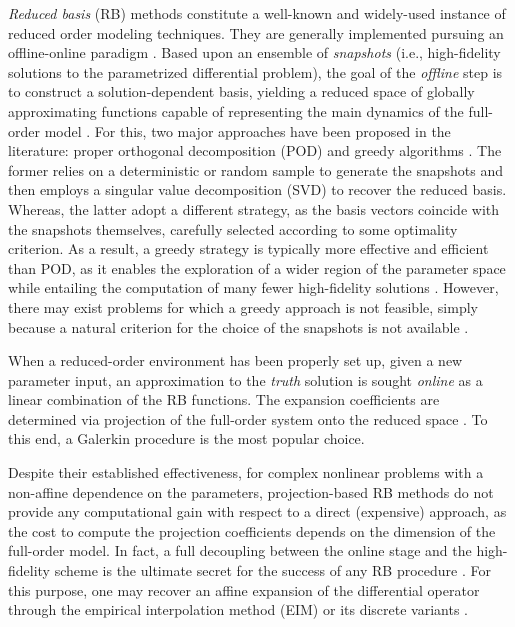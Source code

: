\documentclass{elsarticle}
\theoremstyle{theorem}
\theoremstyle{definition}
\theoremstyle{remark}
\theoremstyle{proposition}
\numberwithin{figure}{section}
\begin{document}
		\emph{Reduced basis} (RB) methods constitute a well-known and widely-used instance of reduced order modeling techniques. They are generally implemented pursuing an offline-online paradigm \cite{Mad06}. Based upon an ensemble of \emph{snapshots} (i.e., high-fidelity solutions to the parametrized differential problem), the goal of the \emph{offline} step is to construct a solution-dependent basis, yielding a reduced space of globally approximating functions capable of representing the main dynamics of the full-order model \cite{Bal14, Chen17}. For this, two major approaches have been proposed in the literature: proper orthogonal decomposition (POD) \cite{Vol08} and greedy algorithms \cite{HSZ14}. The former relies on a deterministic or random sample to generate the snapshots and then employs a singular value decomposition (SVD) to recover the reduced basis. Whereas, the latter adopt a different strategy, as the basis vectors coincide with the snapshots themselves, carefully selected according to some optimality criterion. As a result, a greedy strategy is typically more effective and efficient than POD, as it enables the exploration of a wider region of the parameter space while entailing the computation of many fewer high-fidelity solutions \cite{HSR16}. However, there may exist problems for which a greedy approach is not feasible, simply because a natural criterion for the choice of the snapshots is not available \cite{Bal14}.
		
		When a reduced-order environment has been properly set up, given a new parameter input, an approximation to the \emph{truth} solution is sought \emph{online} as a linear combination of the RB functions. The expansion coefficients are determined via projection of the full-order system onto the reduced space \cite{Buf12}. To this end, a Galerkin procedure is the most popular choice. 
		
		Despite their established effectiveness, for complex nonlinear problems with a non-affine dependence on the parameters, projection-based RB methods do not provide any computational gain with respect to a direct (expensive) approach, as the cost to compute the projection coefficients depends on the dimension of the full-order model. In fact, a full decoupling between the online stage and the high-fidelity scheme is the ultimate secret for the success of any RB procedure \cite{QMN15}. For this purpose, one may recover an affine expansion of the differential operator through the empirical interpolation method (EIM) \cite{Bar04} or its discrete variants \cite{Cha10, NMA15}. 
		
\end{document}
